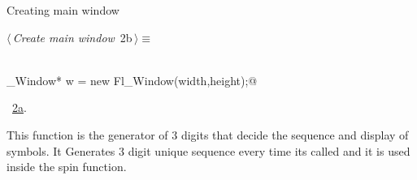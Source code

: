 \documentclass{article}
\renewcommand{\NWtarget}[2]{\hypertarget{#1}{#2}}
\renewcommand{\NWlink}[2]{\hyperlink{#1}{#2}}
\begin{document}
\begin{flushleft}
\begin{minipage}{\linewidth}
\begin{list}{}{}
\mbox{}\verb@@\hbox{$\langle\,${\it Show window with its controls}\nobreak\ {\footnotesize \NWlink{nuweb7b}{7b}}$\,\rangle$}\verb@@\\
\mbox{}\verb@return(Fl::run());@\\
\mbox{}\verb@ @\\
\mbox{}\verb@}@\\
\mbox{}\verb@@{\NWsep}
\end{list}
\vspace{-1.5ex}
\footnotesize
\begin{list}{}{\setlength{\itemsep}{-\parsep}\setlength{\itemindent}{-\leftmargin}}

\item{}
\end{list}
\end{minipage}\vspace{4ex}
\end{flushleft}
Creating main window
\begin{flushleft} \small
\begin{minipage}{\linewidth}\label{scrap2}\raggedright\small
\NWtarget{nuweb2b}{} $\langle\,${\it Create main window}\nobreak\ {\footnotesize {2b}}$\,\rangle\equiv$
\vspace{-1ex}
\begin{list}{}{} \item
\mbox{}\verb@@\\
\mbox{}\verb@Fl_Window* w = new Fl_Window(width,height);@\\
\mbox{}\verb@@{\NWsep}
\end{list}
\vspace{-1.5ex}
\footnotesize
\begin{list}{}{\setlength{\itemsep}{-\parsep}\setlength{\itemindent}{-\leftmargin}}
\item \NWtxtMacroRefIn\ \NWlink{nuweb2a}{2a}.

\item{}
\end{list}
\end{minipage}\vspace{4ex}
\end{flushleft}
This function is the generator of 3 digits that decide the sequence and display of symbols.  It Generates 3 digit unique sequence every time its called and it is used inside the spin function.
\end{document}
